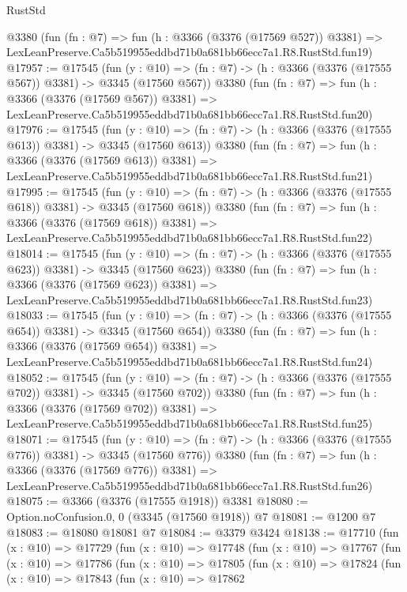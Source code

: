 \begin{lexlean}{RustStd}
\begin{coremodule}
    @3380
    (fun (fn : @7) =>
    fun (h : @3366 (@3376 (@17569 @527)) @3381) =>
    LexLeanPreserve.Ca5b519955eddbd71b0a681bb66ecc7a1.R8.RustStd.fun19)
@17957 := @17545
    (fun (y : @10) => (fn : @7) -> (h : @3366 (@3376 (@17555 @567)) @3381) -> @3345 (@17560 @567))
    @3380
    (fun (fn : @7) =>
    fun (h : @3366 (@3376 (@17569 @567)) @3381) =>
    LexLeanPreserve.Ca5b519955eddbd71b0a681bb66ecc7a1.R8.RustStd.fun20)
@17976 := @17545
    (fun (y : @10) => (fn : @7) -> (h : @3366 (@3376 (@17555 @613)) @3381) -> @3345 (@17560 @613))
    @3380
    (fun (fn : @7) =>
    fun (h : @3366 (@3376 (@17569 @613)) @3381) =>
    LexLeanPreserve.Ca5b519955eddbd71b0a681bb66ecc7a1.R8.RustStd.fun21)
@17995 := @17545
    (fun (y : @10) => (fn : @7) -> (h : @3366 (@3376 (@17555 @618)) @3381) -> @3345 (@17560 @618))
    @3380
    (fun (fn : @7) =>
    fun (h : @3366 (@3376 (@17569 @618)) @3381) =>
    LexLeanPreserve.Ca5b519955eddbd71b0a681bb66ecc7a1.R8.RustStd.fun22)
@18014 := @17545
    (fun (y : @10) => (fn : @7) -> (h : @3366 (@3376 (@17555 @623)) @3381) -> @3345 (@17560 @623))
    @3380
    (fun (fn : @7) =>
    fun (h : @3366 (@3376 (@17569 @623)) @3381) =>
    LexLeanPreserve.Ca5b519955eddbd71b0a681bb66ecc7a1.R8.RustStd.fun23)
@18033 := @17545
    (fun (y : @10) => (fn : @7) -> (h : @3366 (@3376 (@17555 @654)) @3381) -> @3345 (@17560 @654))
    @3380
    (fun (fn : @7) =>
    fun (h : @3366 (@3376 (@17569 @654)) @3381) =>
    LexLeanPreserve.Ca5b519955eddbd71b0a681bb66ecc7a1.R8.RustStd.fun24)
@18052 := @17545
    (fun (y : @10) => (fn : @7) -> (h : @3366 (@3376 (@17555 @702)) @3381) -> @3345 (@17560 @702))
    @3380
    (fun (fn : @7) =>
    fun (h : @3366 (@3376 (@17569 @702)) @3381) =>
    LexLeanPreserve.Ca5b519955eddbd71b0a681bb66ecc7a1.R8.RustStd.fun25)
@18071 := @17545
    (fun (y : @10) => (fn : @7) -> (h : @3366 (@3376 (@17555 @776)) @3381) -> @3345 (@17560 @776))
    @3380
    (fun (fn : @7) =>
    fun (h : @3366 (@3376 (@17569 @776)) @3381) =>
    LexLeanPreserve.Ca5b519955eddbd71b0a681bb66ecc7a1.R8.RustStd.fun26)
@18075 := @3366 (@3376 (@17555 @1918)) @3381
@18080 := Option.noConfusion.{0, 0} (@3345 (@17560 @1918)) @7
@18081 := @1200 @7
@18083 := @18080 @18081 @7
@18084 := @3379 @3424
@18138 := @17710
    (fun (x : @10) =>
    @17729
      (fun (x : @10) =>
      @17748
        (fun (x : @10) =>
        @17767
          (fun (x : @10) =>
          @17786
            (fun (x : @10) =>
            @17805
              (fun (x : @10) =>
              @17824
                (fun (x : @10) =>
                @17843
                  (fun (x : @10) =>
                  @17862

\end{coremodule}
\end{lexlean}
